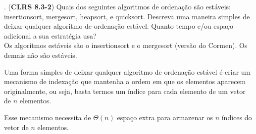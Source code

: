 
. (\textbf{CLRS 8.3-2}) Quais dos seguintes algoritmos de ordenação são estáveis: insertionsort, mergesort, heapsort, e quicksort. Descreva uma maneira simples de deixar qualquer algoritmo de ordenação estável. Quanto tempo e/ou espaço adicional a sua estratégia usa?\\[6pt]
Os algoritmos estáveis são o insertionsort e o mergesort (versão do Cormen). Os demais não são estáveis.

Uma forma simples de deixar qualquer algoritmo de ordenação estável é criar um mecanismo de indexação que mantenha a ordem em que os elementos aparecem originalmente, ou seja, basta termos um índice para cada elemento de um vetor de $n$ elementos.

Esse mecanismo necessita de $\Theta(n)$ espaço extra para armazenar os $n$ índices do vetor de $n$ elementos.\\
